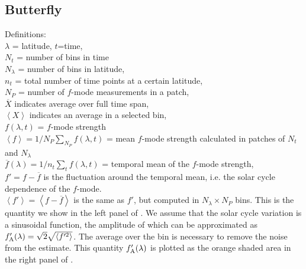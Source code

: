 \documentclass{aa}
\begin{document}
\subsection{Butterfly}

Definitions:\\
$\lambda$ = latitude, $t$=time, \\
$N_t$ = number of bins in time \\
$N_\lambda$ = number of bins in latitude, \\
$n_t$ = total number of time points at a certain latitude, \\
$N_P$ = number of $f$-mode measurements in a patch, \\
$\overline{X}$ indicates average over full time span, \\
$\left< X \right>$ indicates an average in a selected bin, \\
$f(\lambda,t)$ = $f$-mode strength \\
$\left< f \right>=1/N_P \sum_{N_P} f (\lambda,t)$ = mean $f$-mode strength calculated in patches of $N_t$ and $N_\lambda$ \\
$\overline{f}(\lambda) = 1/n_t \sum_t f(\lambda,t)$ = temporal mean of the $f$-mode strength, \\
$f'=f-\overline{f}$ is the fluctuation around the temporal mean, i.e. the solar cycle dependence of the $f$-mode.\\
$\left< f' \right> = \left< f - \overline{f} \right> $ is the same as $f'$, but computed in $N_\lambda \times N_P$ bins. This is the quantity we show in the left panel of .
We assume that the solar cycle variation is a sinusoidal function, the amplitude of which can be approximated as 
$f'_{\rm A} (\lambda) = 
\sqrt{2} \sqrt{\left<{f'^2}\right>}$. 
The average over the bin is necessary to remove the noise from the estimate.
This quantity $f'_{\rm A} (\lambda)$ is plotted as the orange shaded area in the right panel of .
\end{document}
